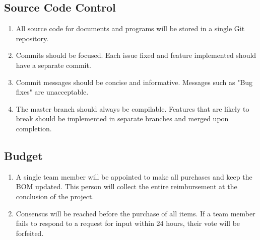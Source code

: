 \documentclass[a4paper]{article}
\begin{document}
\subsection{Source Code Control}
\begin{enumerate}[label=(\alph*)]
	\item All source code for documents and programs will be stored in a single Git repository.
	\item Commits should be focused. Each issue fixed and feature implemented should have a separate commit.
	\item Commit messages should be concise and informative. Messages such as "Bug fixes" are unacceptable.
	\item The master branch should always be compilable. Features that are likely to break should  be implemented in separate branches and merged upon completion.
\end{enumerate}

\subsection{Budget}
\begin{enumerate}[label=(\alph*)]
	\item A single team member will be appointed to make all purchases and keep the BOM updated. This person will collect the entire reimbursement at the conclusion of the project.
	\item Consensus will be reached before the purchase of all items. If a team member fails to respond to a request for input within 24 hours, their vote will be forfeited.
\end{enumerate}
\end{document}
